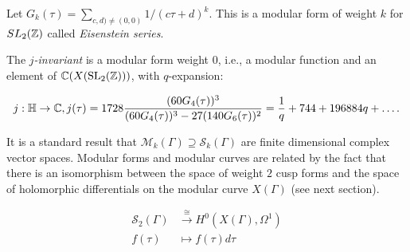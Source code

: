 \begin{example}
Let $G_k(\tau) = \sum_{c,d) \not = (0,0)} 1/(c\tau + d)^k$. This is a modular form of weight $k$ for $SL_2(\mathbb{Z})$ called \textit{Eisenstein series}. 

    The \textit{$j$-invariant} is a modular form weight $0$, i.e., a modular function and an element of $\mathbb{C}(X(\operatorname{SL}_2(\mathbb{Z})))$, with $q$-expansion:

    \begin{align*}
        j: \mathbb{H} \rightarrow \mathbb{C}, j(\tau) = 1728 \frac{(60 G_4(\tau))^3}{(60 G_4(\tau))^3 - 27 (140 G_6(\tau))^2} = \frac{1}{q} + 744 + 196884q + \ldots.
    \end{align*}
\end{example}

It is a standard result that $\mathcal{M}_k(\Gamma) \supseteq \mathcal{S}_k(\Gamma)$ are finite dimensional complex vector spaces. Modular forms and modular curves are related by the fact that there is an isomorphism between the space of weight $2$ cusp forms and the space of holomorphic differentials on the modular curve $X(\Gamma)$ (see next section). 

\begin{align*}
\mathcal{S}_2(\Gamma) &\xrightarrow{\cong} H^0(X(\Gamma),\Omega^1) \\
f(\tau) &\mapsto f(\tau) d\tau
\end{align*}